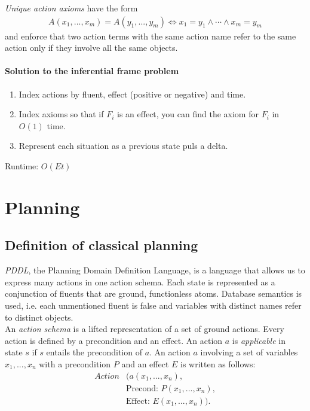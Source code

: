 \documentclass{article}
\begin{document}
\begin{definition}
    \emph{Unique action axioms} have the form
    \begin{align*}
        A(x_1,...,x_m)=A(y_1,...,y_m)\Leftrightarrow x_1 = y_1\wedge\cdots \wedge x_m=y_m
    \end{align*}
    and enforce that two action terms with the same action name refer to the
    same action only if they involve all the same objects.
\end{definition}

\paragraph{Solution to the inferential frame problem}

\begin{enumerate}
    \item Index actions by fluent, effect (positive or negative) and time.
    \item Index axioms so that if $F_i$ is an effect, you can find the axiom for $F_i$ in $O(1)$ time.
    \item Represent each situation as a previous state puls a delta.
\end{enumerate}
Runtime: $O(Et)$

\section{Planning}

\subsection{Definition of classical planning}

\begin{definition}
    \emph{PDDL}, the Planning Domain Definition Language, is a language
    that allows us to express many actions in one action schema.
    Each state is represented as a conjunction of fluents that are ground,
    functionless atoms. Database semantics is used, i.e. each unmentioned
    fluent is false and variables with distinct names refer to distinct
    objects.\\
    An \emph{action schema} is a lifted representation of a set of ground
    actions. Every action is defined by a precondition and an effect. An
    action $a$ is \emph{applicable} in state $s$ if $s$ entails the precondition
    of $a$. An action $a$ involving a set of variables $x_1,...,x_n$ with
    a precondition $P$ and an effect $E$ is written as follows:
    \begin{align*}
        Action&(a(x_1, ..., x_n),\\
              &\text{Precond: } P(x_1, ..., x_n),\\
              &\text{Effect: } E(x_1, ..., x_n)).
    \end{align*}
\end{definition}
\end{document}

